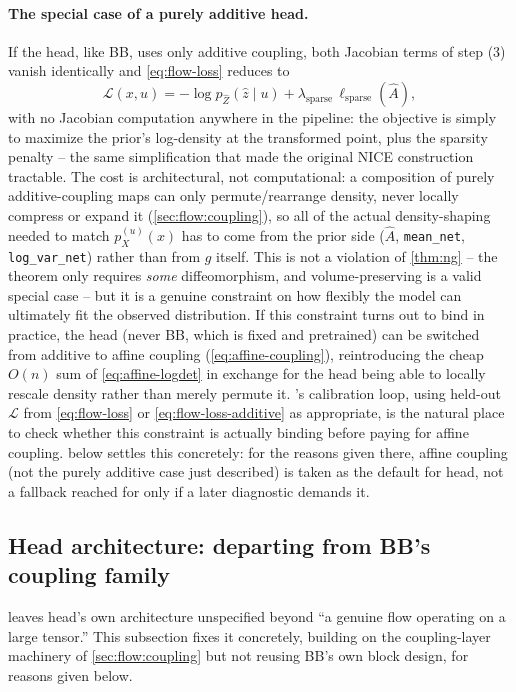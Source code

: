 \paragraph{The special case of a purely additive head.} If the head, like BB, uses only additive coupling,
both Jacobian terms of step (3) vanish identically and \cref{eq:flow-loss} reduces to
\begin{equation}
\mathcal L(x,u) = -\log p_{\hat Z}(\hat z\mid u) + \lambda_{\mathrm{sparse}}\,\ell_{\mathrm{sparse}}(\hat A),
\label{eq:flow-loss-additive}
\end{equation}
with no Jacobian computation anywhere in the pipeline: the objective is simply to maximize the prior's
log-density at the transformed point, plus the sparsity penalty -- the same simplification that made the
original NICE construction tractable. The cost is architectural, not computational: a composition of
purely additive-coupling maps can only permute/rearrange density, never locally compress or expand it
(\cref{sec:flow:coupling}), so all of the actual density-shaping needed to match $p_X^{(u)}(x)$ has to
come from the prior side ($\hat A$, \texttt{mean\_net}, \texttt{log\_var\_net}) rather than from $g$
itself. This is not a violation of \cref{thm:ng} -- the theorem only requires \emph{some} diffeomorphism,
and volume-preserving is a valid special case -- but it is a genuine constraint on how flexibly the model
can ultimately fit the observed distribution. If this constraint turns out to bind in practice, the head
(never BB, which is fixed and pretrained) can be switched from additive to affine coupling
(\cref{eq:affine-coupling}), reintroducing the cheap $O(n)$ sum of \cref{eq:affine-logdet} in exchange for
the head being able to locally rescale density rather than merely permute it. 's
calibration loop, using held-out $\mathcal L$ from \cref{eq:flow-loss} or \cref{eq:flow-loss-additive} as
appropriate, is the natural place to check whether this constraint is actually binding before paying for
affine coupling.  below settles this concretely: for the reasons given there,
affine coupling (not the purely additive case just described) is taken as the default for head, not a
fallback reached for only if a later diagnostic demands it.

\subsection{Head architecture: departing from BB's coupling family}
\label{sec:flow:headarch}
 leaves head's own architecture unspecified beyond ``a genuine flow operating on a
large tensor.'' This subsection fixes it concretely, building on the coupling-layer machinery of
\cref{sec:flow:coupling} but not reusing BB's own block design, for reasons given below.

